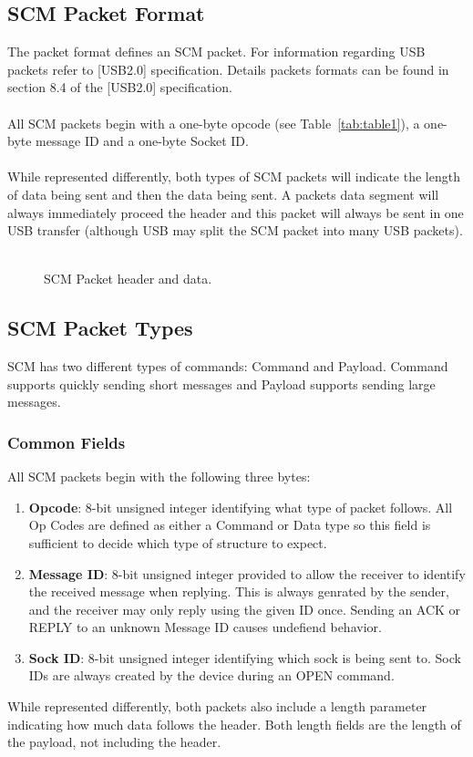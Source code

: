 \documentclass[10pt]{article}
\begin{document}
	\subsection{SCM Packet Format}
	The packet format defines an SCM packet. For information regarding USB packets refer to [USB2.0] specification. Details packets formats can be found in section 8.4 of the [USB2.0] specification. \\
	\\
	All SCM packets begin with a one-byte opcode (see Table~\ref{tab:table1}), a one-byte message ID and a one-byte Socket ID. \\
	\\
	While represented differently, both types of SCM packets will indicate the length of data being sent and then the data being sent. A packets data segment will always immediately proceed the header and this packet will always be sent in one USB transfer (although USB may split the SCM packet into many USB packets). \\
	\\
	\begin{figure}[H]
		\caption[SCM Packet header and data.]{SCM Packet header and data.}
			\centerline {
		} 
	\end{figure}
	\subsection{SCM Packet Types}
	SCM has two different types of commands: Command and Payload. Command supports quickly sending short messages and Payload supports sending large messages.
	\subsubsection{Common Fields}
	All SCM packets begin with the following three bytes:\\
	\begin{enumerate}
		\item \textbf{Opcode}: 8-bit unsigned integer identifying what type of packet follows. All Op Codes are defined as either a Command or Data type so this field is sufficient to decide which type of structure to expect.
		\item \textbf{Message ID}: 8-bit unsigned integer provided to allow the receiver to identify the received message when replying. This is always genrated by the sender, and the receiver may only reply using the given ID once. Sending an ACK or REPLY to an unknown Message ID causes undefiend behavior.
		\item \textbf{Sock ID}: 8-bit unsigned integer identifying which sock is being sent to. Sock IDs are always created by the device during an OPEN command.
	\end{enumerate}
	While represented differently, both packets also include a length parameter indicating how much data follows the header. Both length fields are the length of the payload, not including the header. 
	
\end{document}
